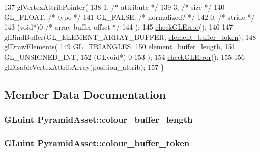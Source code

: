 \begin{DoxyCode}
137   glVertexAttribPointer(
138     1,        \textcolor{comment}{/* attribute */}
139     3,        \textcolor{comment}{/* size */}
140     GL\_FLOAT,   \textcolor{comment}{/* type */}
141     GL\_FALSE,   \textcolor{comment}{/* normalized? */}
142     0,        \textcolor{comment}{/* stride */}
143     (\textcolor{keywordtype}{void}*)0    \textcolor{comment}{/* array buffer offset */}
144   );
145   \hyperlink{PyramidAsset_8cc_a75f201b0e53e68726854997957322b8d}{checkGLError}();
146 
147   glBindBuffer(GL\_ELEMENT\_ARRAY\_BUFFER, \hyperlink{classPyramidAsset_a6f7e2f50904d2941e33df8eb7f5f9c2d}{element\_buffer\_token});
148   glDrawElements(
149     GL\_TRIANGLES,
150     \hyperlink{classPyramidAsset_a5566105859271b493eab3b5f9c02f866}{element\_buffer\_length},
151     GL\_UNSIGNED\_INT,
152     (GLvoid*) 0
153   );
154   \hyperlink{PyramidAsset_8cc_a75f201b0e53e68726854997957322b8d}{checkGLError}();
155 
156   glDisableVertexAttribArray(position\_attrib);
157 \}
\end{DoxyCode}


\subsection{Member Data Documentation}
\hypertarget{classPyramidAsset_addd87a747d7bd186bd1b3e3070185c69}{}
\subsubsection[{colour\+\_\+buffer\+\_\+length}]{\setlength{\rightskip}{0pt plus 5cm}G\+Luint Pyramid\+Asset\+::colour\+\_\+buffer\+\_\+length\hspace{0.3cm}{\ttfamily [private]}}\label{classPyramidAsset_addd87a747d7bd186bd1b3e3070185c69}
\hypertarget{classPyramidAsset_a1c82b429f52d92feefacb5755017aec0}{}
\subsubsection[{colour\+\_\+buffer\+\_\+token}]{\setlength{\rightskip}{0pt plus 5cm}G\+Luint Pyramid\+Asset\+::colour\+\_\+buffer\+\_\+token\hspace{0.3cm}{\ttfamily [private]}}\label{classPyramidAsset_a1c82b429f52d92feefacb5755017aec0}
\hypertarget{classPyramidAsset_a5566105859271b493eab3b5f9c02f866}{}
